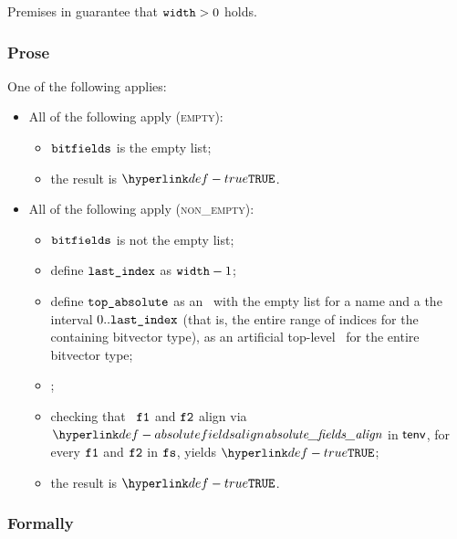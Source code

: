 Premises in  guarantee that $\vwidth > 0$ holds.

\subsubsection{Prose}
One of the following applies:
\begin{itemize}
  \item All of the following apply (\textsc{empty}):
  \begin{itemize}
    \item $\vbitfields$ is the empty list;
    \item the result is $\True$.
  \end{itemize}

  \item All of the following apply (\textsc{non\_empty}):
  \begin{itemize}
    \item $\vbitfields$ is not the empty list;
    \item define $\vlastindex$ as $\vwidth - 1$;
    \item define $\vtopabsolute$ as an \absolutebitfield\ with the empty list
          for a name and a the interval $0..\vlastindex$ (that is, the entire range
          of indices for the containing bitvector type),
          as an artificial top-level \absolutebitfield\ for the entire bitvector type;
    \item \Prosebitfieldstoabsolute{$\tenv$}{$\vbitfields$}{$\vtopabsolute$}{$\vfs$};
    \item checking that \absolutebitfields\ $\vfone$ and $\vftwo$ align via
          $\absolutefieldsalign$ in $\tenv$, for every $\vfone$ and $\vftwo$ in $\vfs$,
          yields $\True$\ProseTerminateAs{\BitfieldsNotAligned};
    \item the result is $\True$.
  \end{itemize}
\end{itemize}

\subsubsection{Formally}
\begin{mathpar}
\end{mathpar}

\begin{mathpar}
\end{mathpar}

